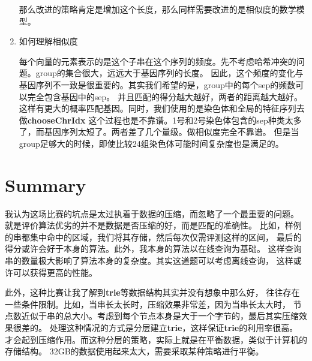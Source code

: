 \documentclass[hyperref,UTF8]{ctexart}
\theoremstyle{definition}
\theoremstyle{remark}
\numberwithin{equation}{subsection}
\newcommand{\Emph}{\textbf}
\begin{document}
\begin{enumerate}
		那么改进的策略肯定是增加这个长度，那么同样需要改进的是相似度的数学模型。

		\item 如何理解相似度

		每个向量的元素表示的是这个子串在这个序列的频度。先不考虑哈希冲突的问题。group的集合很大，远远大于基因序列的长度。
		因此，这个频度的变化与基因序列不一致是很重要的。其实我们希望的是，group中的每个sep的频数可以完全包含基因中的sep。
		并且匹配的得分越大越好，两者的距离越大越好。这样有更大的概率匹配基因。同时，我们使用的是染色体和全局的特征序列去做\Emph{chooseChrIdx}
		这个过程也是不靠谱。1号和2号染色体包含的sep种类太多了，而基因序列太短了。两者差了几个量级。做相似度完全不靠谱。
		但是当group足够大的时候，即使比较24组染色体可能时间复杂度也是满足的。

	\end{enumerate}
	
\section{Summary}	
\label{sec:summary}
	
	我认为这场比赛的坑点是太过执着于数据的压缩，而忽略了一个最重要的问题。
	就是评价算法优劣的并不是数据是否压缩的好，而是匹配的准确性。
	比如，样例的串都集中命中的区域，我们将其存储，然后每次仅需评测这样的区间，
	最后的得分或许会好于本身的算法。此外，我本身的算法以在线查询为基础。
	这样查询串的数量极大影响了算法本身的复杂度。其实这道题可以考虑离线查询，
	这样或许可以获得更高的性能。
	
	此外，这种比赛让我了解到\Emph{trie}等数据结构其实并没有想象中那么好，
	往往存在一些条件限制。比如，当串长太长时，压缩效果非常差，因为当串长太大时，
	节点数近似于串的总大小。考虑到每个节点本身是大于一个字节的，最后其实压缩效果很差的。
	处理这种情况的方式是分层建立\Emph{trie}，这样保证\Emph{trie}的利用率很高。
	才会起到压缩作用。而这种分层的策略，实际上就是在平衡数据，类似于计算机的存储结构。
	32GB的数据使用起来太大，需要采取某种策略进行平衡。
\end{document}
